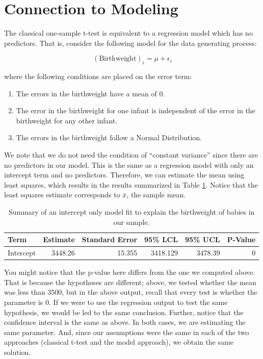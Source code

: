 \documentclass[]{book}
\providecommand{\tightlist}{%
  \setlength{\itemsep}{0pt}\setlength{\parskip}{0pt}}
\theoremstyle{definition}
\theoremstyle{definition}
\theoremstyle{definition}
\theoremstyle{remark}
\begin{document}
\section{Connection to Modeling}\label{connection-to-modeling}

The classical one-sample t-test is equivalent to a regression model
which has no predictors. That is, consider the following model for the
data generating process:

\[(\text{Birthweight})_i = \mu + \epsilon_i\]

where the following conditions are placed on the error term:

\begin{enumerate}
\def\labelenumi{\arabic{enumi}.}
\tightlist
\item
  The errors in the birthweight have a mean of 0.
\item
  The error in the birthweight for one infant is independent of the
  error in the birthweight for any other infant.
\item
  The errors in the birthweight follow a Normal Distribution.
\end{enumerate}

We note that we do not need the condition of ``constant variance'' since
there are no predictors in our model. This is the same as a regression
model with only an intercept term and no predictors. Therefore, we can
estimate the mean using least squares, which results in the results
summarized in Table \ref{tab:onemean-fit}. Notice that the least squares
estimate corresponds to \(\bar{x}\), the sample mean.

\begin{table}

\caption{\label{tab:onemean-fit}Summary of an intercept only model fit to explain the birthweight of babies in our sample.}
\centering
\begin{tabular}[t]{l|r|r|r|r|r}
\hline
Term & Estimate & Standard Error & 95\% LCL & 95\% UCL & P-Value\\
\hline
Intercept & 3448.26 & 15.355 & 3418.129 & 3478.39 & 0\\
\hline
\end{tabular}
\end{table}

You might notice that the p-value here differs from the one we computed
above. That is because the hypotheses are different; above, we tested
whether the mean was less than 3500, but in the above output, recall
that every test is whether the parameter is 0. If we were to use the
regression output to test the same hypothesis, we would be led to the
same conclusion. Further, notice that the confidence interval is the
same as above. In both cases, we are estimating the same parameter. And,
since our assumptions were the same in each of the two approaches
(classical t-test and the model approach), we obtain the same solution.
\end{document}
